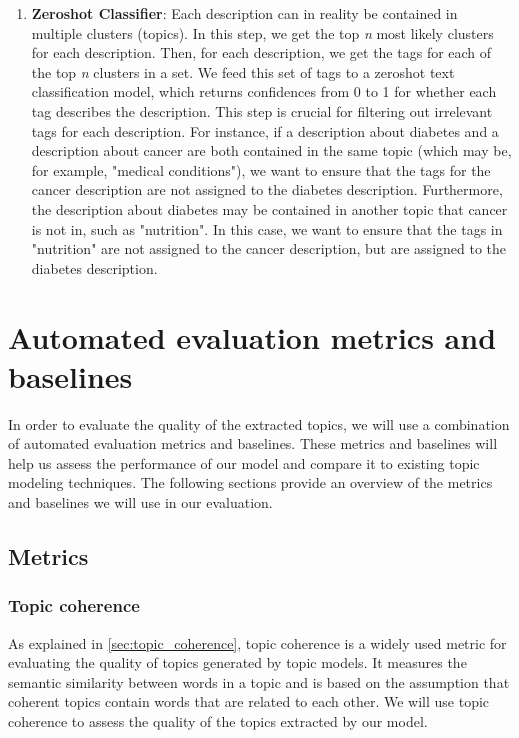 \begin{enumerate}
    \item \textbf{Zeroshot Classifier}: Each description can in reality be contained in multiple clusters (topics). In this step, we get the top \textit{n} most likely clusters for each description. Then, for each description, we get the tags for each of the top \textit{n} clusters in a set. We feed this set of tags to a zeroshot text classification model, which returns confidences from 0 to 1 for whether each tag describes the description. This step is crucial for filtering out irrelevant tags for each description. For instance, if a description about diabetes and a description about cancer are both contained in the same topic (which may be, for example, "medical conditions"), we want to ensure that the tags for the cancer description are not assigned to the diabetes description. Furthermore, the description about diabetes may be contained in another topic that cancer is not in, such as "nutrition". In this case, we want to ensure that the tags in "nutrition" are not assigned to the cancer description, but are assigned to the diabetes description.

\end{enumerate}


\section{Automated evaluation metrics and baselines}
In order to evaluate the quality of the extracted topics, we will use a combination of automated evaluation metrics and baselines. These metrics and baselines will help us assess the performance of our model and compare it to existing topic modeling techniques. The following sections provide an overview of the metrics and baselines we will use in our evaluation.

\subsection{Metrics}
\subsubsection{Topic coherence}
As explained in \cref{sec:topic_coherence}, topic coherence is a widely used metric for evaluating the quality of topics generated by topic models. It measures the semantic similarity between words in a topic and is based on the assumption that coherent topics contain words that are related to each other. We will use topic coherence to assess the quality of the topics extracted by our model.

